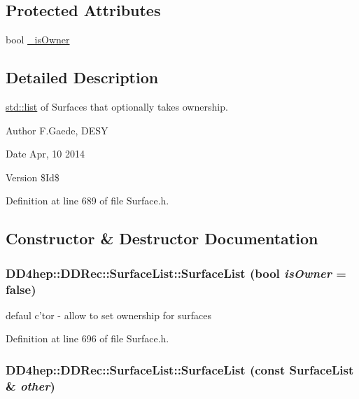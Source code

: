 \subsection*{Protected Attributes}
\begin{DoxyCompactItemize}
\item 
bool \hyperlink{class_d_d4hep_1_1_d_d_rec_1_1_surface_list_a6eb49bbfb8b3b4f548dd9d52f0e0e507}{\_\-isOwner}
\end{DoxyCompactItemize}


\subsection{Detailed Description}
\hyperlink{classstd_1_1list}{std::list} of Surfaces that optionally takes ownership. \begin{DoxyAuthor}{Author}
F.Gaede, DESY 
\end{DoxyAuthor}
\begin{DoxyDate}{Date}
Apr, 10 2014 
\end{DoxyDate}
\begin{DoxyVersion}{Version}
\$Id\$ 
\end{DoxyVersion}


Definition at line 689 of file Surface.h.

\subsection{Constructor \& Destructor Documentation}
\hypertarget{class_d_d4hep_1_1_d_d_rec_1_1_surface_list_abc669093649a9e2714176cd2162f75b5}{
\subsubsection[{SurfaceList}]{\setlength{\rightskip}{0pt plus 5cm}DD4hep::DDRec::SurfaceList::SurfaceList (bool {\em isOwner} = {\ttfamily false})}}
\label{class_d_d4hep_1_1_d_d_rec_1_1_surface_list_abc669093649a9e2714176cd2162f75b5}


defaul c'tor -\/ allow to set ownership for surfaces 

Definition at line 696 of file Surface.h.\hypertarget{class_d_d4hep_1_1_d_d_rec_1_1_surface_list_a0815581e1cd48827919bd78fdc01107c}{
\subsubsection[{SurfaceList}]{\setlength{\rightskip}{0pt plus 5cm}DD4hep::DDRec::SurfaceList::SurfaceList (const {\bf SurfaceList} \& {\em other})}}
\label{class_d_d4hep_1_1_d_d_rec_1_1_surface_list_a0815581e1cd48827919bd78fdc01107c}


